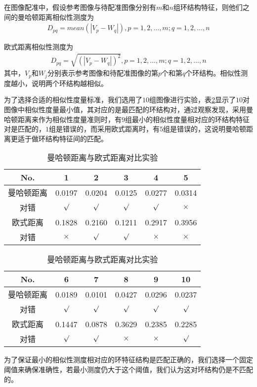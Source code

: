 在图像配准中，假设参考图像与待配准图像分别有$m$和$n$组环结构特征，则他们之间的曼哈顿距离相似性测度为
\begin{align}
D_{pq} = mean(|V_p-W_q|), p = 1, 2, \ldots, m; q = 1, 2, \ldots, n
\end{align}

欧式距离相似性测度为
\begin{align}
D_{pq} = \sqrt{(|V_p-W_q|)^2}, p = 1, 2, \ldots, m; q = 1, 2, \ldots, n
\end{align}
其中，$V_p$和$W_j$分别表示参考图像和待配准图像的第$p$个和第$q$个环结构。相似性测度越小，说明两个环结构越相似。

为了选择合适的相似性度量标准，我们选用了$10$组图像进行实验，表\ref{table:similarity}显示了$10$对图像中相似性度量最小值，其对应的是最匹配的环结构对，通过观察发现，采用曼哈顿距离来作为相似性度量准则时，有$9$组最小的相似性度量相对应的环结构特征对是匹配的，$1$组是错误的，而采用欧式距离时，有$5$组是错误的，这说明曼哈顿距离更适于做环结构特征间的匹配。

\begin{table}[H]
\caption{曼哈顿距离与欧式距离对比实验}
\centering
\begin{tabular}{cccccc}
\hline
\rowcolor{gray!50}
No. & 1  & 2 & 3 & 4 & 5 \\
\hline
曼哈顿距离 & 0.0197 & 0.0204 & 0.0125 & 0.0277 & 0.0314 \\
\rowcolor{gray!50}
对错 & $\surd$ & $\surd$ & $\surd$ & $\surd$ & $\times$ \\
欧式距离 & 0.1828 & 0.2160 & 0.1211 & 0.2917 & 0.3956 \\
\rowcolor{gray!50}
对错 & $\times$ & $\surd$ & $\surd$ & $\times$& $\times$\\
\hline
\end{tabular}
\begin{tabular}{cccccc}
\hline
\rowcolor{gray!50}
No. &  6 & 7 & 8 & 9 & 10\\
\hline
曼哈顿距离 & 0.0189 & 0.0101 & 0.0427 &0.0296 &0.0237  \\
\rowcolor{gray!50}
对错 & $\surd$ & $\surd$ & $\surd$ & $\surd$ & $\surd$ \\
欧式距离 &0.1447 & 0.0878 & 0.3629 & 0.2385 & 0.2285\\
\rowcolor{gray!50}
对错 & $\surd$ & $\surd$ & $\times$ & $\times$ & $\surd$ \\
\hline
\end{tabular}
\label{table:similarity}
\end{table}

为了保证最小的相似性测度相对应的环特征结构是匹配正确的，我们选择一个固定阈值来确保准确性，若最小测度仍大于这个阈值，我们认为这对环结构仍是不匹配的。

